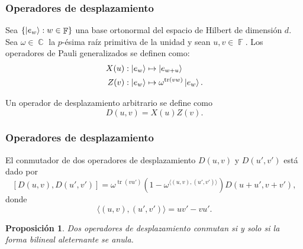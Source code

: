 \documentclass[10pt, spanish]{beamer}
\DeclareMathOperator{\C}{\mathbb{C}}
\DeclareMathOperator{\F}{\mathbb{F}}
\DeclareMathOperator{\tr}{tr}
\newtheorem{proposition}{Proposición}
\begin{document}
  \begin{frame}
    \frametitle{Operadores de desplazamiento}

    
    \begin{definition}
      Sea $\{\ket{e_w} : w \in \F\}$ una base ortonormal del
      espacio de Hilbert de dimensión $d$.  Sea $\omega \in
      \C$ la $p$-ésima raíz primitiva de la unidad y sean
      $u, v \in \F$. Los operadores de Pauli generalizados
      se definen como:
      \begin{align}
        X(u) &: \ket{e_w} \mapsto \ket{e_{w+u}} \\
        Z(v) &: \ket{e_w} \mapsto \omega^{\tr(vw)}
        \ket{e_w}.
      \end{align}
    \end{definition}

    \begin{definition}
      Un operador de desplazamiento arbitrario se define como
      \begin{equation}
        D(u,v) 
        = X(u) Z(v).
      \end{equation}
    \end{definition}
  \end{frame}

  \begin{frame}
    \frametitle{Operadores de desplazamiento}

    El conmutador de dos operadores de desplazamiento
    $D(u,v)$ y $D(u',v')$ está dado por
    \begin{equation}
      \left[
        D(u,v), D(u',v')
      \right]
      = \omega^{\tr(vu')} \left( 1 - \omega^{\langle (u,v),
      (u',v') \rangle} \right) D(u+u', v+v'),
    \end{equation}
    donde
    \begin{equation}
      \langle (u,v), (u',v') \rangle
      = uv' - vu'.
    \end{equation}

    \begin{proposition}
      Dos operadores de desplazamiento conmutan si y solo si
      la forma bilineal aleternante se anula.
    \end{proposition}
  \end{frame}
\end{document}
